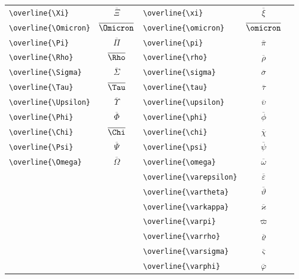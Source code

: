 \documentclass[12pt,a4paper]{article}
\begin{document}
\begin{longtable}{|l|c|l|c|c|}
\verb|\overline{\Xi}|            & $\overline{\Xi}$      & \verb|\overline{\xi}|         & $\overline{\xi}$         & \\
\verb|\overline{\Omicron}|       & $\overline{\Omicron}$ & \verb|\overline{\omicron}|    & $\overline{\omicron}$    & \\
\verb|\overline{\Pi}|            & $\overline{\Pi}$      & \verb|\overline{\pi}|         & $\overline{\pi}$         & \\
\verb|\overline{\Rho}|           & $\overline{\Rho}$     & \verb|\overline{\rho}|        & $\overline{\rho}$        & \\
\verb|\overline{\Sigma}|         & $\overline{\Sigma}$   & \verb|\overline{\sigma}|      & $\overline{\sigma}$      & \\
\verb|\overline{\Tau}|           & $\overline{\Tau}$     & \verb|\overline{\tau}|        & $\overline{\tau}$        & \\
\verb|\overline{\Upsilon}|       & $\overline{\Upsilon}$ & \verb|\overline{\upsilon}|    & $\overline{\upsilon}$    & \\
\verb|\overline{\Phi}|           & $\overline{\Phi}$     & \verb|\overline{\phi}|        & $\overline{\phi}$        & \\
\verb|\overline{\Chi}|           & $\overline{\Chi}$     & \verb|\overline{\chi}|        & $\overline{\chi}$        & \\
\verb|\overline{\Psi}|           & $\overline{\Psi}$     & \verb|\overline{\psi}|        & $\overline{\psi}$        & \\
\verb|\overline{\Omega}|         & $\overline{\Omega}$   & \verb|\overline{\omega}|      & $\overline{\omega}$      & \\
                                 &                       & \verb|\overline{\varepsilon}| & $\overline{\varepsilon}$ & \\
                                 &                       & \verb|\overline{\vartheta}|   & $\overline{\vartheta}$   & \\
                                 &                       & \verb|\overline{\varkappa}|   & $\overline{\varkappa}$   & \\
                                 &                       & \verb|\overline{\varpi}|      & $\overline{\varpi}$      & \\
                                 &                       & \verb|\overline{\varrho}|     & $\overline{\varrho}$     & \\
                                 &                       & \verb|\overline{\varsigma}|   & $\overline{\varsigma}$   & \\
                                 &                       & \verb|\overline{\varphi}|     & $\overline{\varphi}$     & \\
\hline
\end{longtable}
\end{document}
